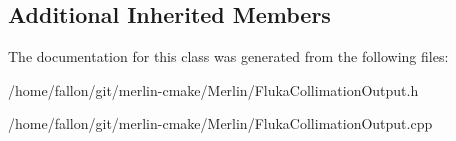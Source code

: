 \subsection*{Additional Inherited Members}


The documentation for this class was generated from the following files\+:\begin{DoxyCompactItemize}
\item 
/home/fallon/git/merlin-\/cmake/\+Merlin/Fluka\+Collimation\+Output.\+h\item 
/home/fallon/git/merlin-\/cmake/\+Merlin/Fluka\+Collimation\+Output.\+cpp\end{DoxyCompactItemize}
